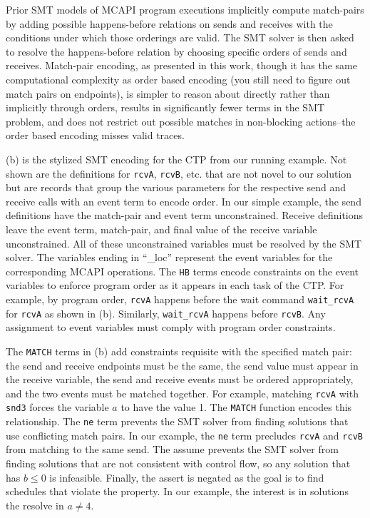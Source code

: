 Prior SMT models of MCAPI program executions implicitly compute
match-pairs by adding possible happens-before relations on sends and
receives with the conditions under which those orderings are
valid. The SMT solver is then asked to resolve the happens-before
relation by choosing specific orders of sends and receives. Match-pair
encoding, as presented in this work, though it has the same
computational complexity as order based encoding (you still need to
figure out match pairs on endpoints), is simpler to reason about
directly rather than implicitly through orders, results in
significantly fewer terms in the SMT problem, and does not restrict
out possible matches in non-blocking actions--the order based encoding
misses valid traces.

(b) is the stylized SMT encoding for the CTP from our running
example. Not shown are the definitions for \texttt{rcvA}, \texttt{rcvB}, etc.
that are not novel to our solution but are records that group the various
parameters for the respective send and receive calls with an event term to
encode order. In our simple example, the send definitions have the match-pair and event
term unconstrained. Receive definitions leave the event term, match-pair, and final
value of the receive variable unconstrained. All of these unconstrained variables must
be resolved by the SMT solver. The variables ending in ``\_loc'' represent the
event variables for the corresponding MCAPI operations. The \texttt{HB} terms
encode constraints on the event variables to enforce program order as it
appears in each task of the CTP. For example, by program order, \texttt{rcvA}
happens before the wait command \texttt{wait\_rcvA} for \texttt{rcvA} as shown in (b). Similarly,
\texttt{wait\_rcvA} happens before \texttt{rcvB}. Any assignment to event
variables must comply with program order constraints.

The \texttt{MATCH} terms in (b) add constraints
requisite with the specified match pair: the send and
receive endpoints must be the same, the send value must appear in the
receive variable, the send and receive events must be ordered
appropriately, and the two events must be matched together. For
example, matching \texttt{rcvA} with \texttt{snd3} forces the variable
$a$ to have the value 1. The \texttt{MATCH} function encodes this
relationship. The \texttt{ne} term prevents the SMT solver from
finding solutions that use conflicting match pairs. In our example,
the \texttt{ne} term precludes \texttt{rcvA} and \texttt{rcvB} from
matching to the same send. The assume prevents the SMT solver from
finding solutions that are not consistent with control flow, so any
solution that has $b \leq 0$ is infeasible. Finally, the assert is negated
as the goal is to find schedules that violate the property. In our
example, the interest is in solutions the resolve in $a \neq 4$.

